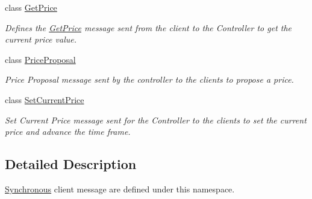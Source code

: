\begin{DoxyCompactItemize}
class \hyperlink{class_terra_swarm_1_1_synchronous_1_1_get_price}{Get\-Price}
\begin{DoxyCompactList}\small\item\em Defines the \hyperlink{class_terra_swarm_1_1_synchronous_1_1_get_price}{Get\-Price} message sent from the client to the Controller to get the current price value. \end{DoxyCompactList}\item 
class \hyperlink{class_terra_swarm_1_1_synchronous_1_1_price_proposal}{Price\-Proposal}
\begin{DoxyCompactList}\small\item\em Price Proposal message sent by the controller to the clients to propose a price. \end{DoxyCompactList}\item 
class \hyperlink{class_terra_swarm_1_1_synchronous_1_1_set_current_price}{Set\-Current\-Price}
\begin{DoxyCompactList}\small\item\em Set Current Price message sent for the Controller to the clients to set the current price and advance the time frame. \end{DoxyCompactList}\end{DoxyCompactItemize}


\subsection{Detailed Description}
\hyperlink{namespace_terra_swarm_1_1_synchronous}{Synchronous} client message are defined under this namespace. 